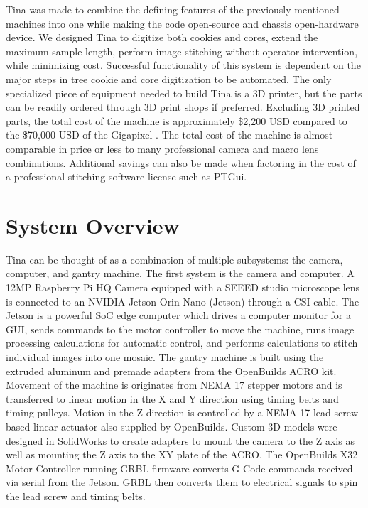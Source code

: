 \documentclass[a4paper,12pt]{article}
\begin{document}
Tina was made to combine the defining features of the previously mentioned machines into one while making the code open-source and chassis open-hardware device. 
We designed Tina to digitize both cookies and cores, extend the maximum sample length, perform image stitching without operator intervention, while minimizing cost. 
Successful functionality of this system is dependent on the major steps in tree cookie and core digitization to be automated. 
The only specialized piece of equipment needed to build Tina is a 3D printer, but the parts can be readily ordered through 3D print shops if preferred.
Excluding 3D printed parts, the total cost of the machine is approximately \$2,200 USD compared to the \$70,000 USD of the Gigapixel \citep{griffin_gigapixel_2021}.
The total cost of the machine is almost comparable in price or less to many professional camera and macro lens combinations.
Additional savings can also be made when factoring in the cost of a professional stitching software license such as PTGui. 

\section{System Overview} %

Tina can be thought of as a combination of multiple subsystems: the camera, computer, and gantry machine. The first system is the camera and computer. 
A 12MP Raspberry Pi HQ Camera equipped with a SEEED studio microscope lens is connected to an NVIDIA Jetson Orin Nano (Jetson) through a CSI cable. 
The Jetson is a powerful SoC edge computer which drives a computer monitor for a GUI, sends commands to the motor controller to move the machine, runs image processing calculations for automatic control, and performs calculations to stitch individual images into one mosaic. 
The gantry machine is built using the extruded aluminum and premade adapters from the OpenBuilds ACRO kit. 
Movement of the machine is originates from NEMA 17 stepper motors and is transferred to
linear motion in the X and Y direction using timing belts and timing pulleys. 
Motion in the Z-direction is controlled by a NEMA 17 lead screw based linear actuator also supplied by OpenBuilds.
Custom 3D models were designed in SolidWorks to create adapters to mount the camera to the Z axis as well as mounting the Z axis to the XY plate of the ACRO. 
The OpenBuilds X32 Motor Controller running GRBL firmware converts G-Code commands received via serial from the Jetson. GRBL then converts them to electrical signals to spin the lead screw and timing belts. 
\end{document}
